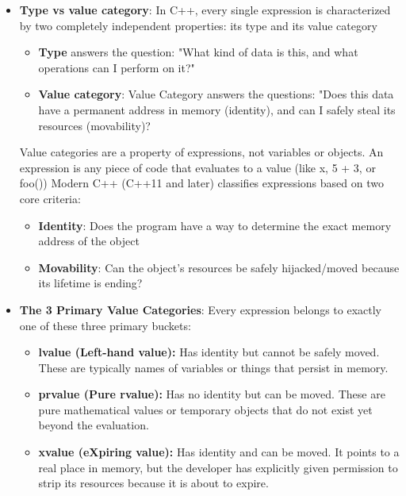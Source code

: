 \documentclass{report}
\begin{document}
\begin{itemize}
\begin{cppcode}
{                    perfectWrapper(a);  // Prints: Lvalue overload
                    perfectWrapper(10); // Prints: Rvalue overload
                }
            \end{cppcode}
        \item \textbf{Type vs value category}: In C++, every single expression is characterized by two completely independent properties: its type and its value category
            \begin{itemize}
                \item \textbf{Type} answers the question: "What kind of data is this, and what operations can I perform on it?" 
                \item \textbf{Value category}: Value Category answers the questions: "Does this data have a permanent address in memory (identity), and can I safely steal its resources (movability)?
            \end{itemize}
            \bigbreak \noindent 
            Value categories are a property of expressions, not variables or objects. An expression is any piece of code that evaluates to a value (like x, 5 + 3, or foo())
            \bigbreak \noindent 
            Modern C++ (C++11 and later) classifies expressions based on two core criteria:
            \begin{itemize}
                \item \textbf{Identity}: Does the program have a way to determine the exact memory address of the object
                \item \textbf{Movability}: Can the object's resources be safely hijacked/moved because its lifetime is ending? 
            \end{itemize}
        \item \textbf{The 3 Primary Value Categories}: Every expression belongs to exactly one of these three primary buckets: 
            \begin{itemize}
                \item \textbf{lvalue (Left-hand value):} Has identity but cannot be safely moved. These are typically names of variables or things that persist in memory.
                \item \textbf{prvalue (Pure rvalue):} Has no identity but can be moved. These are pure mathematical values or temporary objects that do not exist yet beyond the evaluation.
                \item  \textbf{xvalue (eXpiring value):} Has identity and can be moved. It points to a real place in memory, but the developer has explicitly given permission to strip its resources because it is about to expire.

\end{itemize}
\end{itemize}
\end{document}
